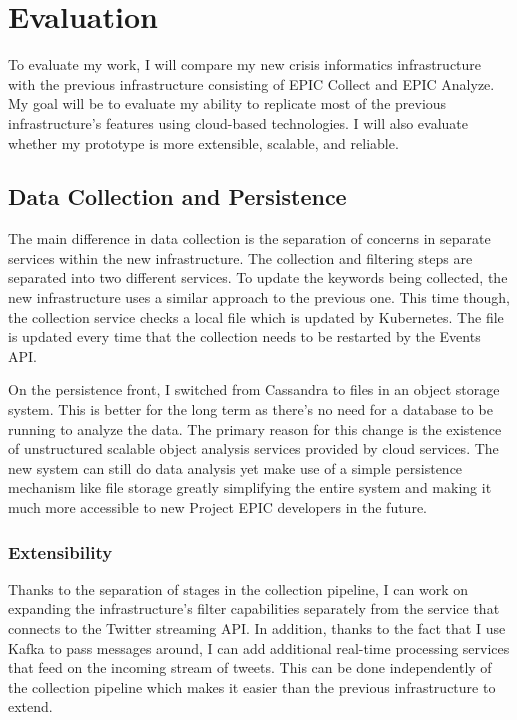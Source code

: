 \chapter{Evaluation}

To evaluate my work, I will compare my new crisis informatics infrastructure with the previous infrastructure consisting of EPIC Collect and EPIC Analyze. My goal will be to evaluate my ability to replicate most of the previous infrastructure's features using cloud-based technologies. I will also evaluate whether my prototype is more extensible, scalable, and reliable.

\section{Data Collection and Persistence}

The main difference in data collection is the separation of concerns in separate services within the new infrastructure. The collection and filtering steps are separated into two different services. To update the keywords being collected, the new infrastructure uses a similar approach to the previous one. This time though, the collection service checks a local file which is updated by Kubernetes. The file is updated every time that the collection needs to be restarted by the Events API.

On the persistence front, I switched from Cassandra to files in an object storage system. This is better for the long term as there's no need for a database to be running to analyze the data. The primary reason for this change is the existence of unstructured scalable object analysis services provided by cloud services. The new system can still do data analysis yet make use of a simple persistence mechanism like file storage greatly simplifying the entire system and making it much more accessible to new Project EPIC developers in the future.

\subsection{Extensibility}

Thanks to the separation of stages in the collection pipeline, I can work on expanding the infrastructure's filter capabilities separately from the service that connects to the Twitter streaming API. In addition, thanks to the fact that I use Kafka to pass messages around, I can add additional real-time processing services that feed on the incoming stream of tweets. This can be done independently of the collection pipeline which makes it easier than the previous infrastructure to extend. 

